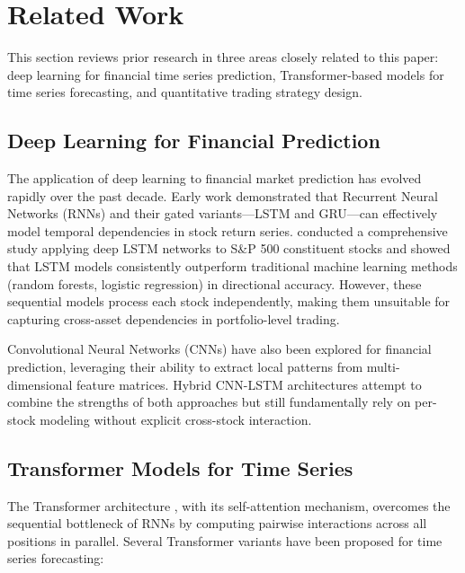 \documentclass[12pt, a4paper]{article}
\begin{document}
\section{Related Work} \label{sec:related}

This section reviews prior research in three areas closely related to this paper: deep learning for financial time series prediction, Transformer-based models for time series forecasting, and quantitative trading strategy design.

\subsection{Deep Learning for Financial Prediction}

The application of deep learning to financial market prediction has evolved rapidly over the past decade. Early work demonstrated that Recurrent Neural Networks (RNNs) and their gated variants---LSTM \citep{hochreiter1997lstm} and GRU---can effectively model temporal dependencies in stock return series. \citet{fischer2018deep} conducted a comprehensive study applying deep LSTM networks to S\&P 500 constituent stocks and showed that LSTM models consistently outperform traditional machine learning methods (random forests, logistic regression) in directional accuracy. However, these sequential models process each stock independently, making them unsuitable for capturing cross-asset dependencies in portfolio-level trading.

Convolutional Neural Networks (CNNs) have also been explored for financial prediction, leveraging their ability to extract local patterns from multi-dimensional feature matrices. Hybrid CNN-LSTM architectures attempt to combine the strengths of both approaches but still fundamentally rely on per-stock modeling without explicit cross-stock interaction.

\subsection{Transformer Models for Time Series}

The Transformer architecture \citep{vaswani2017attention}, with its self-attention mechanism, overcomes the sequential bottleneck of RNNs by computing pairwise interactions across all positions in parallel. Several Transformer variants have been proposed for time series forecasting:
\end{document}
